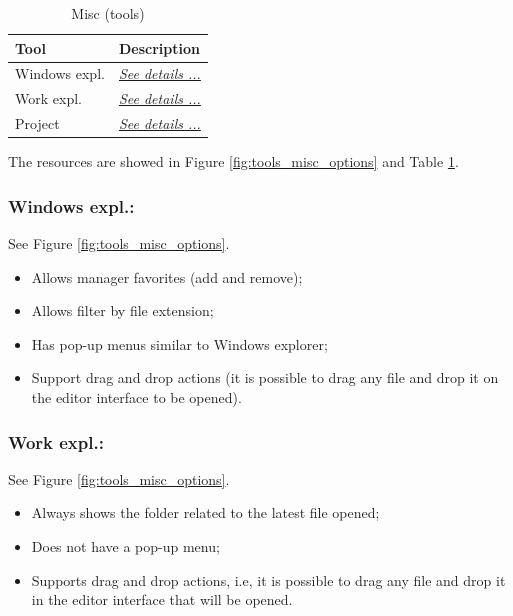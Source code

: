 \begin{table}[H]
  \begin{footnotesize}
    \begin{tabularx}{\textwidth}{>{\hsize=0.3\hsize}X>{\hsize=0.7\hsize}X}\\
      \hline
      \textbf{Tool} & \textbf{Description} \\
      \hline
      Windows expl. & \textit{\href{\#working\_tools\_misc\_windowsexpl}{See details ...}} \\
      Work expl. & \textit{\href{\#working\_tools\_misc\_workexpl}{See details ...}} \\
      Project & \textit{\href{\#working\_tools\_misc\_project}{See details ...}} \\
      \hline
    \end{tabularx}
  \end{footnotesize}
  \caption{Misc (tools)}
  \label{tab:tools_misc}
\end{table}

The resources are showed in
Figure \ref{fig:tools_misc_options} and
Table \ref{tab:tools_misc}.


\hypertarget{working_tools_misc_windowsexpl}{}
\subsubsection{Windows expl.:}

See Figure \ref{fig:tools_misc_options}.

\begin{itemize}
  \item Allows manager favorites (add and remove);
  \item Allows filter by file extension;
  \item Has pop-up menus similar to Windows explorer;
  \item Support drag and drop actions (it is possible to drag
    any file and drop it on the editor interface to be opened).
\end{itemize}


\hypertarget{working_tools_misc_workexpl}{}
\subsubsection{Work expl.:}

See Figure \ref{fig:tools_misc_options}.

\begin{itemize}
  \item Always shows the folder related to the latest file opened;
  \item Does not have a pop-up menu;
  \item Supports drag and drop actions, i.e, it is possible to drag any
    file and drop it in the editor interface that will be opened.
\end{itemize}


